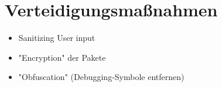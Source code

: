 \section{Verteidigungsmaßnahmen}

\begin{itemize}
    \item Sanitizing User input
    \item "Encryption" der Pakete
    \item "Obfuscation" (Debugging-Symbole entfernen)
\end{itemize}